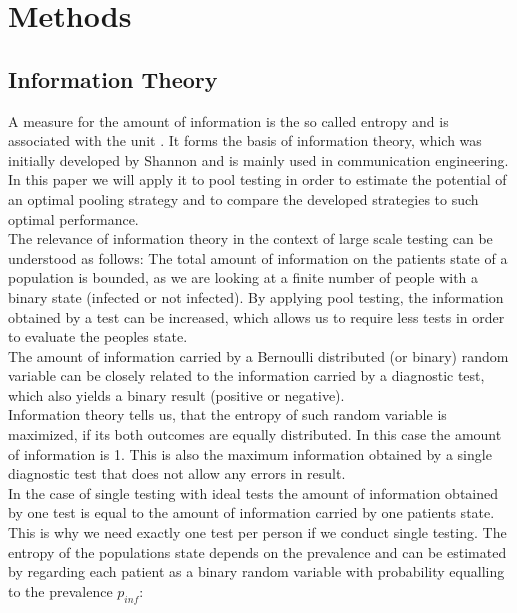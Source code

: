 \documentclass[fleqn,10pt]{wlscirep}
\begin{document}
	
	\section{Methods}
	
	\subsection{Information Theory}
	A measure for the amount of information is the so called \glqq entropy\grqq{} and is associated with the unit \si{\Bit}. It forms the basis of information theory, which was initially developed by Shannon \cite{Shannon} and is mainly used in communication engineering. In this paper we will apply it to pool testing in order to estimate the potential of an optimal pooling strategy and to compare the developed strategies to such optimal performance.\\
	
	The relevance of information theory in the context of large scale testing can be understood as follows: The total amount of information on the patients state of a population is bounded, as we are looking at a finite number of people with a binary state (infected or not infected). By applying pool testing, the information obtained by a test can be increased, which allows us to require less tests in order to evaluate the peoples state.\\
	
	The amount of information carried by a Bernoulli distributed (or binary) random variable can be closely related to the information carried by a diagnostic test, which also yields a binary result (positive or negative).\\
	
	Information theory tells us, that the entropy of such random variable is maximized, if its both outcomes are equally distributed. In this case the amount of information is \SI{1}{\Bit}. This is also the maximum information obtained by a single diagnostic test that does not allow any errors in result.\\
	
	In the case of single testing with ideal tests the amount of information obtained by one test is equal to the amount of information carried by one patients state. This is why we need exactly one test per person if we conduct single testing. The entropy of the populations state depends on the prevalence and can be estimated by regarding each patient as a binary random variable with probability equalling to the prevalence $p_{inf}$:\\
	
\end{document}
